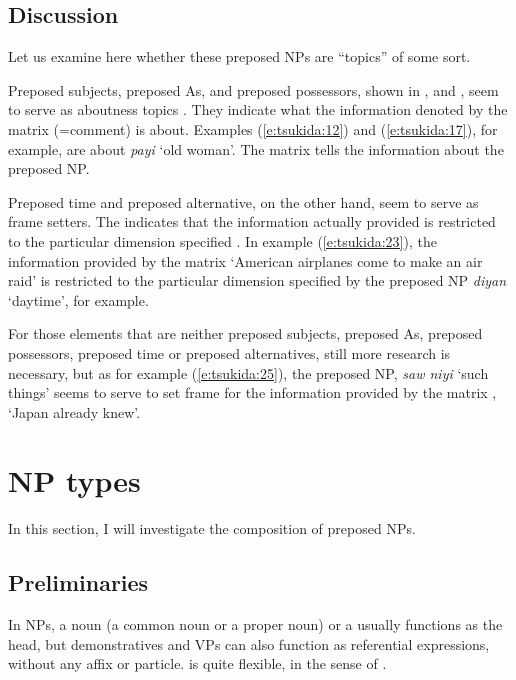 \documentclass[output=paper
,modfonts
,nonflat]{langsci/langscibook}
\begin{document}
\subsection{\label{s:tsukida:2.7}Discussion}

Let us examine here whether these preposed NPs are “topics” of some sort. 

Preposed subjects, preposed As, and preposed possessors, shown in ,  and , seem to serve as aboutness topics \citep[40--41]{Krifka2007}. They indicate what the information denoted by the matrix  (=comment) is about. Examples (\ref{e:tsukida:12}) and (\ref{e:tsukida:17}), for example, are about \textit{payi} ‘old woman’. The matrix  tells the information about the preposed NP. 

Preposed time and preposed alternative, on the other hand, seem to serve as frame setters. The  indicates that the information actually provided is restricted to the particular dimension specified \citep[47]{Krifka2007}. In example (\ref{e:tsukida:23}), the information provided by the matrix  ‘American airplanes come to make an air raid’ is restricted to the particular dimension specified by the preposed NP \textit{diyan} ‘daytime’, for example. 

For those elements that are neither preposed subjects, preposed As, preposed possessors, preposed time or preposed alternatives, still more research is necessary, but as for example (\ref{e:tsukida:25}), the preposed NP, \textit{saw niyi} ‘such things’ seems to serve to set frame for the information provided by the matrix , ‘Japan already knew’.

\section{\label{s:tsukida:3}NP types}

In this section, I will investigate the composition of preposed NPs.

\subsection{\label{s:tsukida:3.1}Preliminaries}

In  NPs, a noun (a common noun or a proper noun) or a  usually functions as the head, but demonstratives and VPs can also function as referential expressions, without any affix or particle.  is quite flexible, in the sense of \citet{vanLier2013}.
\end{document}
